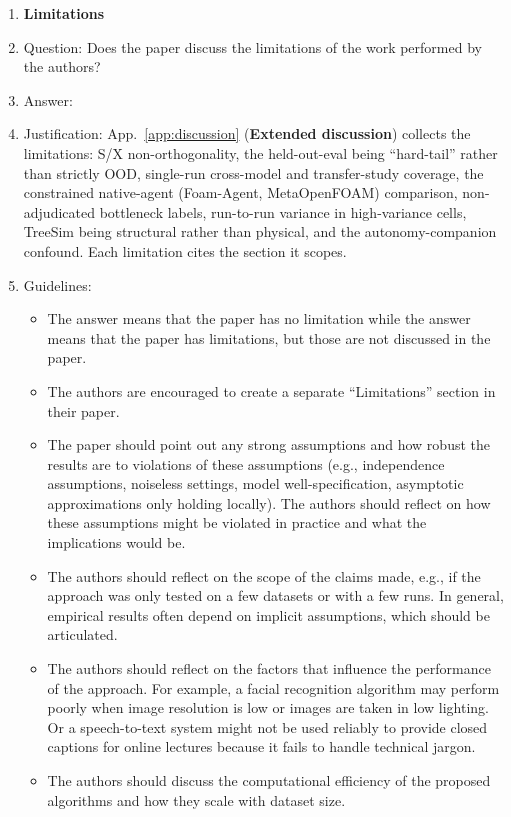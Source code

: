 \begin{enumerate}
\item {\bf Limitations}
    \item[] Question: Does the paper discuss the limitations of the work performed by the authors?
    \item[] Answer: \answerYes{}
    \item[] Justification: App.~\ref{app:discussion} (\textbf{Extended discussion}) collects the limitations: S/X non-orthogonality, the held-out-eval being ``hard-tail'' rather than strictly OOD, single-run cross-model and transfer-study coverage, the constrained native-agent (Foam-Agent, MetaOpenFOAM) comparison, non-adjudicated bottleneck labels, run-to-run variance in high-variance cells, TreeSim being structural rather than physical, and the autonomy-companion confound. Each limitation cites the section it scopes.
    \item[] Guidelines:
    \begin{itemize}
        \item The answer \answerNA{} means that the paper has no limitation while the answer \answerNo{} means that the paper has limitations, but those are not discussed in the paper.
        \item The authors are encouraged to create a separate ``Limitations'' section in their paper.
        \item The paper should point out any strong assumptions and how robust the results are to violations of these assumptions (e.g., independence assumptions, noiseless settings, model well-specification, asymptotic approximations only holding locally). The authors should reflect on how these assumptions might be violated in practice and what the implications would be.
        \item The authors should reflect on the scope of the claims made, e.g., if the approach was only tested on a few datasets or with a few runs. In general, empirical results often depend on implicit assumptions, which should be articulated.
        \item The authors should reflect on the factors that influence the performance of the approach. For example, a facial recognition algorithm may perform poorly when image resolution is low or images are taken in low lighting. Or a speech-to-text system might not be used reliably to provide closed captions for online lectures because it fails to handle technical jargon.
        \item The authors should discuss the computational efficiency of the proposed algorithms and how they scale with dataset size.

\end{itemize}
\end{enumerate}
